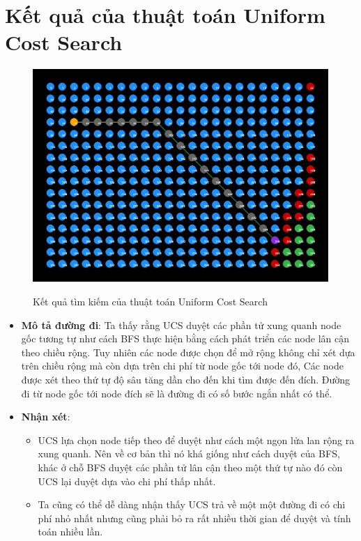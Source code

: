 \section{Kết quả của thuật toán Uniform Cost Search}
\begin{figure}[H]
    \centering
    \includegraphics[scale=0.4]{pic/UCS.jpg}
    \label{fig:my_label}
    \caption{Kết quả tìm kiếm của thuật toán Uniform Cost Search}
\end{figure}
\begin{itemize}
    \item \textbf{Mô tả đường đi}: Ta thấy rằng UCS duyệt các phần tử xung quanh node gốc tương tự như cách BFS thực hiện bằng cách phát triển các node lân cận theo chiều rộng. Tuy nhiên các node được chọn để mở rộng không chỉ xét dựa trên chiều rộng mà còn dựa trên chi phí từ node gốc tới node đó, 
    Các node được xét theo thứ tự độ sâu tăng dần cho đến khi tìm được đến đích. Đường đi từ node gốc tới node đích sẽ là đường đi có số bước ngắn nhất có thể.
    \item \textbf{Nhận xét}:
    \begin{itemize}
        \item UCS lựa chọn node tiếp theo để duyệt như cách một ngọn lửa lan rộng ra xung quanh. Nên về cơ bản thì nó khá giống như cách duyệt của BFS, khác ở chỗ BFS duyệt các phần tử lân cận theo một thứ tự nào đó còn UCS lại duyệt dựa vào chi phí thấp nhất.
        \item Ta cũng có thể dễ dàng nhận thấy UCS trả về một một đường đi có chi phí nhỏ nhất nhưng cũng phải bỏ ra rất nhiều thời gian để duyệt và tính toán nhiều lần.
    \end{itemize}
\end{itemize}
